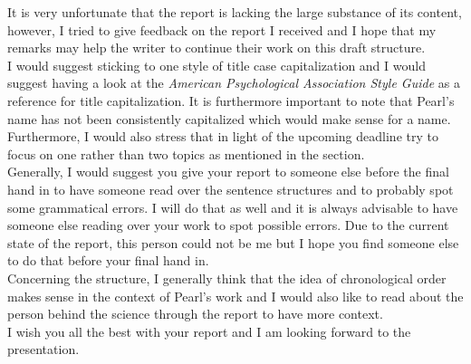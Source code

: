 \documentclass{article}
\begin{document}
It is very unfortunate that the report is lacking the large substance of its content, however, I tried to give feedback on the report I received and I hope that my remarks may help the writer to continue their work on this draft structure.\\
I would suggest sticking to one style of title case capitalization and I would suggest having a look at the \textit{American Psychological Association Style Guide} as a reference for title capitalization.
It is furthermore important to note that Pearl's name has not been consistently capitalized which would make sense for a name.\\
Furthermore, I would also stress that in light of the upcoming deadline try to focus on one rather than two topics as mentioned in the  section. \\
Generally, I would suggest you give your report to someone else before the final hand in to have someone read over the sentence structures and to probably spot some grammatical errors. I will do that as well and it is always advisable to have someone else reading over your work to spot possible errors. Due to the current state of the report, this person could not be me but I hope you find someone else to do that before your final hand in.\\
Concerning the structure, I generally think that the idea of chronological order makes sense in the context of Pearl's work and I would also like to read about the person behind the science through the report to have more context.
\\
I wish you all the best with your report and I am looking forward to the presentation.
\end{document}
